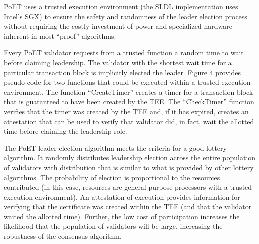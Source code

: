 PoET uses a trusted execution environment (the SLDL implementation uses Intel's SGX) to ensure the safety and randomness
of the leader election process without requiring the costly investment of power and specialized hardware inherent in
most ``proof'' algorithms.

Every PoET validator requests from a trusted function a random time to wait before claiming leadership. The validator
with the shortest wait time for a particular transaction block is implicitly elected the leader. Figure 4 provides
pseudo-code for two functions that could be executed within a trusted execution environment. The function
``CreateTimer'' creates a timer for a transaction block that is guaranteed to have been created by the TEE. The
``CheckTimer'' function verifies that the timer was created by the TEE and, if it has expired, creates an attestation
that can be used to verify that validator did, in fact, wait the allotted time before claiming the leadership role.

The PoET leader election algorithm meets the criteria for a good lottery algorithm. It randomly distributes leadership
election across the entire population of validators with distribution that is similar to what is provided by other
lottery algorithms. The probability of election is proportional to the resources contributed (in this case, resources
are general purpose processors with a trusted execution environment). An attestation of execution provides information
for verifying that the certificate was created within the TEE (and that the validator waited the allotted
time). Further, the low cost of participation increases the likelihood that the population of validators will be large,
increasing the robustness of the consensus algorithm.
